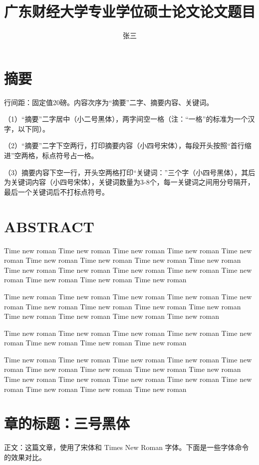 \documentclass[class = professional, twoside,AutoFakeBold=3.17,AutoFakeSlant=0.2]{gdufe_master_thesis}
\title{广东财经大学专业学位硕士论文论文题目}
\author{张三}
\begin{document}
\makecover
\maketitlepage
\makeclaim

\setlength{\baselineskip}{20pt}\selectfont
\frontmatter

\chapter*{ 摘要\the\baselineskip}
\the\baselineskip
行间距：固定值20磅。内容次序为“摘要”二字、摘要内容、关键词。\the\baselineskip

（1）“摘要”二字居中（小二号黑体），两字间空一格（注：“一格”的标准为一个汉字，以下同）。\the\baselineskip

（2）“摘要”二字下空两行，打印摘要内容（小四号宋体），每段开头按照“首行缩进”空两格，标点符号占一格。\the\baselineskip

（3）摘要内容下空一行，开头空两格打印“关键词：”三个字（小四号黑体），其后为关键词内容（小四号宋体），关键词数量为3-8个，每一关键词之间用分号隔开，最后一个关键词后不打标点符号。\the\baselineskip

\chapter*{\bfseries ABSTRACT\the\baselineskip}
Time new roman Time new roman Time new roman Time new roman Time new roman Time new roman Time new roman Time new roman Time new roman Time new roman Time new roman Time new roman Time new roman Time new roman Time new roman Time new roman Time new roman\the\baselineskip

Time new roman Time new roman Time new roman Time new roman Time new roman Time new roman Time new roman Time new roman Time new roman Time new roman Time new roman Time new roman Time new roman\the\baselineskip

Time new roman Time new roman Time new roman Time new roman Time new roman Time new roman Time new roman Time new roman\the\baselineskip

Time new roman Time new roman Time new roman Time new roman Time new roman Time new roman Time new roman Time new roman Time new roman Time new roman Time new roman Time new roman Time new roman Time new roman Time new roman Time new roman Time new roman\the\baselineskip

\tableofcontents

\mainmatter

\chapter{章的标题：三号黑体\the\baselineskip}
正文：这篇文章，使用了宋体和 Times New Roman 字体。下面是一些字体命令的效果对比。\the\baselineskip
\end{document}
